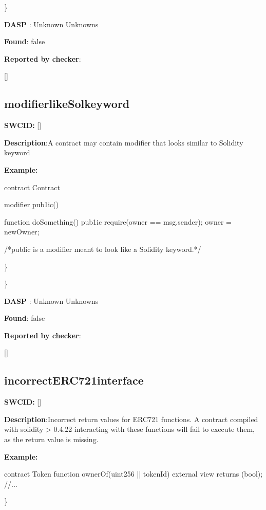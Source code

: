 \documentclass{article}
\begin{document}
\} 

\textbf{DASP} : Unknown Unknowns

\textbf{Found}: false

\textbf{Reported by checker}: 
\begin{ffcode} 

[]
\end{ffcode} 
\subsection{modifier{\textunderscore}like{\textunderscore}Sol{\textunderscore}keyword} 
\textbf{SWC{\textunderscore}ID:} []

\textbf{Description}:A contract may contain modifier that looks similar to Solidity keyword


\textbf{Example:} 
\begin{ffcode} 

contract Contract{
    modifier pub1ic() {
    }

    function doSomething() pub1ic {
        require(owner == msg.sender);
        owner = newOwner;
    }
}

 /*public is a modifier meant to look like a Solidity keyword.*/ 

\end{ffcode} 
\} 

\} 

\textbf{DASP} : Unknown Unknowns

\textbf{Found}: false

\textbf{Reported by checker}: 
\begin{ffcode} 

[]
\end{ffcode} 
\subsection{incorrect{\textunderscore}ERC721{\textunderscore}interface} 
\textbf{SWC{\textunderscore}ID:} []

\textbf{Description}:Incorrect return values for ERC721 functions. A contract compiled with solidity > 0.4.22 interacting with these functions will fail to execute them, as the return value is missing.


\textbf{Example:} 
\begin{ffcode} 

contract Token{
    function ownerOf(uint256 |\textunderscore| tokenId) external view returns (bool);
    //...
}

\end{ffcode} 
\} 
\end{document}
